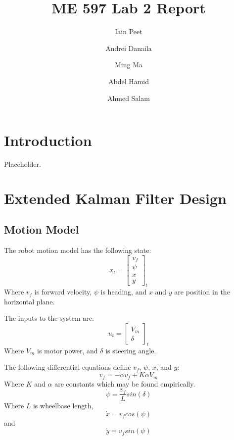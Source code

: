 \documentclass[11pt]{article} %
\title{ME 597 Lab 2 Report}
\author{Iain Peet \and Andrei Danaila \and Ming Ma \and Abdel Hamid \and Ahmed Salam}
\begin{document}
\maketitle

\clearpage

\section{Introduction}

Placeholder.

\section{Extended Kalman Filter Design}

\subsection{Motion Model}
The robot motion model has the following state:
\begin{equation}
x_t = 
\left[ \begin{array}{c}
v_f \\
\psi \\
x \\
y
\end{array} \right] _t
\end{equation}
Where $v_f$ is forward velocity, $\psi$ is heading, and $x$ and $y$ are position in the horizontal plane.  

The inputs to the system are:
\begin{equation}
u_t =
\left[ \begin{array}{c}
V_m \\
\delta
\end{array} \right] _t
\end{equation}
Where $V_m$ is motor power, and $\delta$ is steering angle.

The following differential equations define $v_f$, $\psi$, $x$, and $y$:
\begin{equation}
\dot{v_f} = -\alpha v_f + K \alpha V_m
\label{vf}
\end{equation}
Where $K$ and $\alpha$ are constants which may be found empirically.
\begin{equation}
\dot{\psi} = \frac{v_f}{L} sin(\delta)
\end{equation}
Where $L$ is wheelbase length,
\begin{equation}
\dot{x} = v_f cos( \psi )
\end{equation}
and
\begin{equation}
\dot{y} = v_f sin( \psi )
\label{y}
\end{equation}
\end{document}
